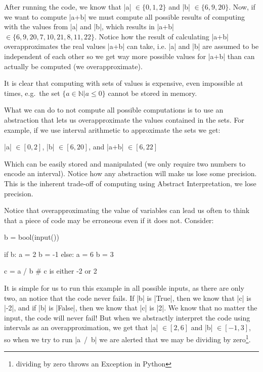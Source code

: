 After running the code, we know that \pycode|a| \(\in \{0, 1, 2\}\) and
\pycode|b| \(\in \{6, 9, 20\}\). Now, if we want to compute \pycode|a+b|
we must compute all possible results of computing with the values from
\pycode|a| and \pycode|b|, which results in \pycode|a+b|
\(\in \{6, 9, 20, 7, 10, 21, 8, 11, 22\}\). Notice how the result of
calculating \pycode|a+b| overapproximates the real values \pycode|a+b|
can take, i.e. \pycode|a| and \pycode|b| are assumed to be independent
of each other so we get way more possible values for \pycode|a+b| than
can actually be computed (we overapproximate).

It is clear that computing with sets of values is expensive, even
impossible at times, e.g.~the set \(\{a \in \mathbb{N} | a \leq 0\}\)
cannot be stored in memory.

What we can do to not compute all possible computations is to use an
abstraction that lets us overapproximate the values contained in the
sets. For example, if we use interval arithmetic to approximate the sets
we get:

\pycode|a| \(\in \left[0, 2\right]\), \pycode|b|
\(\in \left[6, 20\right]\), and \pycode|a+b| \(\in \left[6, 22\right]\)

Which can be easily stored and manipulated (we only require two numbers
to encode an interval). Notice how any abstraction will make us lose
some precision. This is the inherent trade-off of computing using
Abstract Interpretation, we lose precision.

Notice that overapproximating the value of variables can lead us often
to think that a piece of code may be erroneous even if it does not.
Consider:

\begin{pythoncode}
b = bool(input())

if b:
  a = 2
  b = -1
else:
  a = 6
  b = 3

c = a / b  # c is either -2 or 2
\end{pythoncode}

It is simple for us to run this example in all possible inputs, as there
are only two, an notice that the code never fails. If \pycode|b| is
\pycode|True|, then we know that \pycode|c| is \pycode|-2|, and if
\pycode|b| is \pycode|False|, then we know that \pycode|c| is
\pycode|2|. We know that no matter the input, the code will never fail!
But when we abstractly interpret the code using intervals as an
overapproximation, we get that \pycode|a| \(\in [2,6]\) and \pycode|b|
\(\in [-1,3]\), so when we try to run \pycode|a\ /\ b| we are alerted
that we may be dividing by zero\footnote{dividing by zero throws an
  Exception in Python}.

